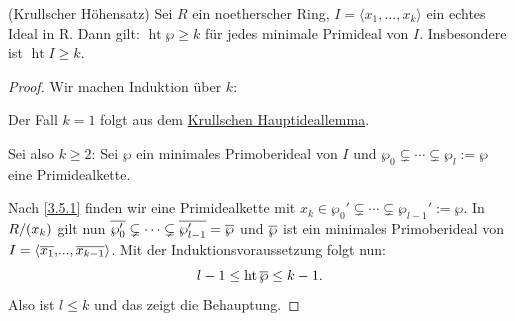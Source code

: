 \documentclass[a4paper,12pt,index=toc]{scrbook}
\theoremstyle{keinenummern} %
\newcommand{\hoehe}{\operatorname{ht}}
\renewcommand{\dotsc}{\ensuremath{\!...}}
\def\Bar#1{\ensuremath\overline{#1}}
\begin{document}
\begin{prop}\label{3.5.3}(Krullscher Höhensatz)
Sei $R$ ein noetherscher Ring, $I=\langle x_1,\dotsc,x_k\rangle$ ein echtes Ideal in R. Dann gilt: $\hoehe \wp\ge k$ für jedes minimale Primideal von $I$. Insbesondere ist $\hoehe I\ge k$.
\end{prop}
\begin{proof} Wir machen Induktion über $k$:

Der Fall $k=1$ folgt aus dem \hyperref[khil]{Krullschen Hauptideallemma}.

Sei also $k\ge 2$: Sei $\wp$ ein minimales Primoberideal von $I$ und $\wp_0\subsetneq \dotsm \subsetneq \wp_l:=\wp$ eine Primidealkette.

Nach \cref{3.5.1} finden wir eine Primidealkette mit $x_{k}\in\wp_0'\subsetneq \dotsm \subsetneq \wp_{l-1}':=\wp$. In $\Quotient{R}{(x_{k})}$ gilt nun $\Bar{\wp_0'}\subsetneq \dotsm \subsetneq \Bar{\wp_{l-1}'}=\Bar{\wp}$ und $\Bar{\wp}$ ist ein minimales Primoberideal von $I=\langle\Bar{x_1},\dotsc,\Bar{x_{k-1}}\rangle$. Mit der Induktionsvoraussetzung folgt nun: 
\[l-1\leq \hoehe \Bar{\wp}\leq k-1.\]
Also ist $l\leq k$ und das zeigt die Behauptung.
\end{proof}
\end{document}
